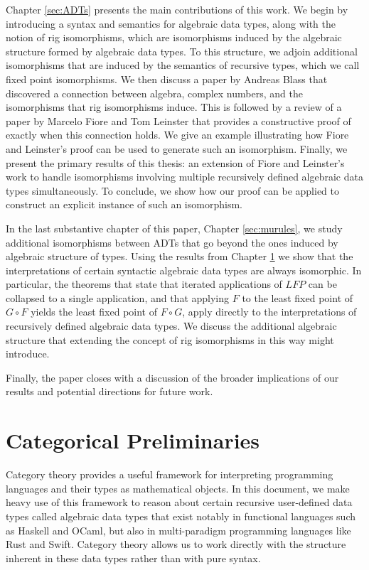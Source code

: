\documentclass{msthesis}
\theoremstyle{definition}
\begin{document}
Chapter \ref{sec:ADTs} presents the main contributions of this work.  We begin by introducing a syntax and semantics for algebraic data types, along with the notion of rig isomorphisms, which are isomorphisms induced by the algebraic structure formed by algebraic data types.  To this structure, we adjoin additional isomorphisms that are induced by the semantics of recursive types, which we call fixed point isomorphisms.  We then discuss a paper by Andreas Blass that discovered a connection between algebra, complex numbers, and the isomorphisms that rig isomorphisms induce.  This is followed by a review of a paper by Marcelo Fiore and Tom Leinster that provides a constructive proof of exactly when this connection holds.  We give an example illustrating how Fiore and Leinster's proof can be used to generate such an isomorphism.  Finally, we present the primary results of this thesis: an extension of Fiore and Leinster's work to handle isomorphisms involving multiple recursively defined algebraic data types simultaneously.  To conclude, we show how our proof can be applied to construct an explicit instance of such an isomorphism.

In the last substantive chapter of this paper, Chapter \ref{sec:murules}, we study additional isomorphisms between ADTs that go beyond the ones induced by algebraic structure of types.  Using the results from Chapter \ref{sec:catprelim} we show that the interpretations of certain syntactic algebraic data types are always isomorphic.  In particular, the theorems that state that iterated applications of $LFP$ can be collapsed to a single application, and that applying $F$ to the least fixed point of $G \circ F$ yields the least fixed point of $F \circ G$, apply directly to the interpretations of recursively defined algebraic data types.  We discuss the additional algebraic structure that extending the concept of rig isomorphisms in this way might introduce.

Finally, the paper closes with a discussion of the broader implications of our results and potential directions for future work.

\newpage 

\chapter{Categorical Preliminaries}\label{sec:catprelim}

Category theory provides a useful framework for interpreting programming languages and their types as mathematical objects.  In this document, we make heavy use of this framework to reason about certain recursive user-defined data types called algebraic data types that exist notably in functional languages such as Haskell and OCaml, but also in multi-paradigm programming languages like Rust and Swift.  Category theory allows us to work directly with the structure inherent in these data types rather than with pure syntax.
\end{document}

